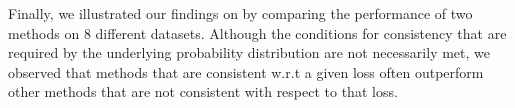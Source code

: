 Finally, we illustrated our findings on by comparing the performance of two methods on 8 different datasets. Although the conditions for consistency that are required by the underlying probability distribution are not necessarily met, we observed that methods that are consistent w.r.t a given loss often outperform other methods that are not consistent with respect to that loss.


\newpage

\begin{fullwidth}


\end{fullwidth}






